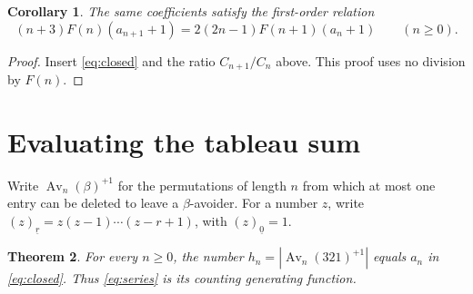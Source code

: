 \documentclass[10pt]{article}
\newtheorem{theorem}{Theorem}
\newtheorem{corollary}[theorem]{Corollary}
\begin{document}
\begin{corollary}\label{cor:first}
The same coefficients satisfy the first-order relation
\[
 (n+3)F(n)(a_{n+1}+1)
 =2(2n-1)F(n+1)(a_n+1)\qquad(n\geq0).
\]
\end{corollary}
\begin{proof}
Insert \eqref{eq:closed} and the ratio $C_{n+1}/C_n$ above.
This proof uses no division by $F(n)$.
\end{proof}

\section{Evaluating the tableau sum}
Write $\operatorname{Av}_n(\beta)^{+1}$ for the permutations of length $n$
from which at most one entry can be deleted to leave a $\beta$-avoider.
For a number $z$, write $(z)_{\underline r}=z(z-1)\cdots(z-r+1)$,
with $(z)_{\underline0}=1$.
\begin{theorem}\label{thm:counting}
For every $n\geq0$, the number
$h_n=|\operatorname{Av}_n(321)^{+1}|$ equals $a_n$ in
\eqref{eq:closed}. Thus \eqref{eq:series} is its counting generating function.
\end{theorem}
\end{document}
